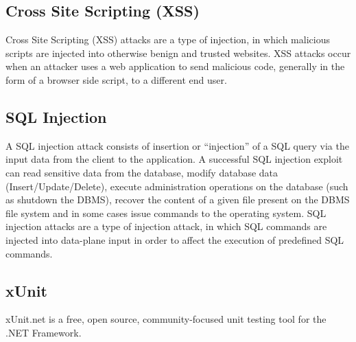 \subsection*{Cross Site Scripting (XSS)}
Cross Site Scripting (XSS) attacks are a type of injection, in which malicious scripts are injected into otherwise benign and trusted websites. XSS attacks occur when an attacker uses a web application to send malicious code, generally in the form of a browser side script, to a different end user.
\subsection*{SQL Injection}
A SQL injection attack consists of insertion or ``injection” of a SQL query via the input data from the client to the application. A successful SQL injection exploit can read sensitive data from the database, modify database data (Insert/Update/Delete), execute administration operations on the database (such as shutdown the DBMS), recover the content of a given file present on the DBMS file system and in some cases issue commands to the operating system. SQL injection attacks are a type of injection attack, in which SQL commands are injected into data-plane input in order to affect the execution of predefined SQL commands.
\subsection*{xUnit}
xUnit.net is a free, open source, community-focused unit testing tool for the .NET Framework. 

